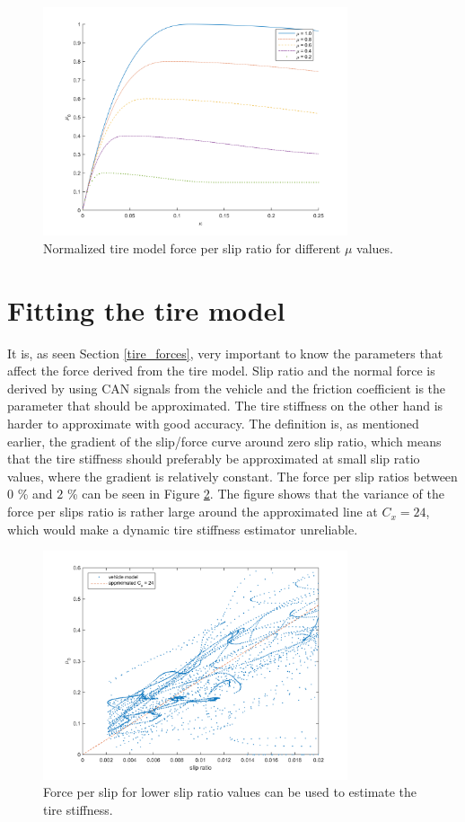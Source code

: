 \begin{figure}[h]
	\centering
	\includegraphics[width=0.8\textwidth]{Pictures/slipkraft_olika_mue}
	\caption {Normalized tire model force per slip ratio for different $ \mu $ values.}
	\label{different_mue}
\end{figure}

\section{Fitting the tire model}
It is, as seen Section \ref{tire_forces}, very important to know the parameters that affect the force derived from the tire model. Slip ratio and the normal force is derived by using CAN signals from the vehicle and the friction coefficient is the parameter that should be approximated. The tire stiffness on the other hand is harder to approximate with good accuracy. The definition is, as mentioned earlier, the gradient of the slip/force curve around zero slip ratio, which means that the tire stiffness should preferably be approximated at small slip ratio values, where the gradient is relatively constant. The force per slip ratios between $ 0 $ \% and $ 2 $ \% can be seen in Figure \ref{slip_kraft_sma_slip}. The figure shows that the variance of the force per slips ratio is rather large around the approximated line at $ C_{x} = 24 $, which would make a dynamic tire stiffness estimator unreliable.

\begin{figure}[h]
	\centering
	\includegraphics[width=0.8\textwidth]{Pictures/slip_kraft_sma_slip}
	\caption {Force per slip for lower slip ratio values can be used to estimate the tire stiffness.}
	\label{slip_kraft_sma_slip}
\end{figure}

